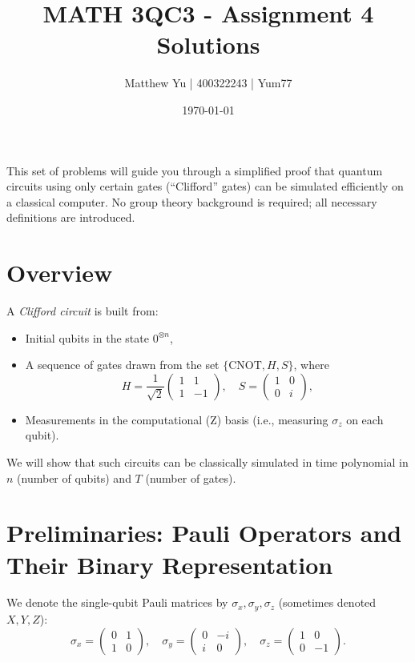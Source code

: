\documentclass{article}
\begin{document}
\title{MATH 3QC3 - Assignment 4 Solutions}
\author{Matthew Yu | 400322243 | Yum77}
\date{\today}
\maketitle
This set of problems will guide you through a simplified proof that quantum circuits using only certain gates (``Clifford'' gates) can be simulated efficiently on a classical computer. No group theory background is required; all necessary definitions are introduced.

\section*{Overview}
A \textit{Clifford circuit} is built from:
\begin{itemize}
    \item Initial qubits in the state \(0^{\otimes n}\),
    \item A sequence of gates drawn from the set \(\{\text{CNOT}, H, S\}\), where
    \[
    H = \frac{1}{\sqrt{2}}\begin{pmatrix}1 & 1 \\ 1 & -1\end{pmatrix}, \quad S = \begin{pmatrix}1 & 0 \\ 0 & i\end{pmatrix},
    \]
    \item Measurements in the computational (Z) basis (i.e., measuring \(\sigma_z\) on each qubit).
\end{itemize}
We will show that such circuits can be classically simulated in time polynomial in \(n\) (number of qubits) and \(T\) (number of gates).

\section*{Preliminaries: Pauli Operators and Their Binary Representation}
We denote the single-qubit Pauli matrices by \(\sigma_x, \sigma_y, \sigma_z\) (sometimes denoted \(X, Y, Z\)):
\[
\sigma_x = \begin{pmatrix}0 & 1 \\ 1 & 0\end{pmatrix}, \quad \sigma_y = \begin{pmatrix}0 & -i \\ i & 0\end{pmatrix}, \quad \sigma_z = \begin{pmatrix}1 & 0 \\ 0 & -1\end{pmatrix}.
\]
\end{document}
